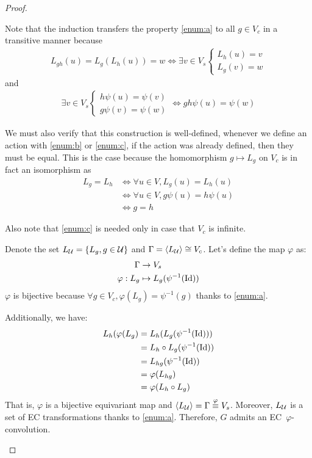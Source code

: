 \begin{proof}
\begin{enumerate}
Note that the induction transfers the property \ref{enum:a} to all $g \in V_c$ in a transitive manner because
\begin{gather*}
L_{gh}(u) = L_g(L_h(u)) = w \Leftrightarrow \exists v \in V_s
\begin{cases}
L_h(u) = v\\
L_g(v) = w
\end{cases}
\end{gather*}
and
\begin{gather*}
\exists v \in V_s
\begin{cases}
h\psi(u) = \psi(v)\\
g\psi(v) = \psi(w)
\end{cases}
\Leftrightarrow gh\psi(u) = \psi(w)
\end{gather*}

We must also verify that this construction is well-defined, \ie whenever we define an action with \ref{enum:b} or \ref{enum:c}, if the action was already defined, then they must be equal. This is the case because the homomorphism $g \mapsto L_g$ on $V_c$ is in fact an isomorphism as
\begin{align*}
L_g = L_h & \Leftrightarrow \forall u \in V, L_g(u) = L_h(u)\\
 & \Leftrightarrow \forall u \in V, g\psi(u) = h\psi(u)\\
 & \Leftrightarrow g = h
\end{align*}

Also note that \ref{enum:c} is needed only in case that $V_c$ is infinite.

Denote the set $L_{\mathcal{U}} = \{L_g, g \in \mathcal{U} \}$ and $\Gamma = \langle L_{\mathcal{U}} \rangle \cong V_c$. Let's define the map $\varphi$ as:
\begin{align*}
\Gamma & \rightarrow V_s\\
\varphi: L_g & \mapsto L_g(\psi^{-1}(\operatorname{Id}))
\end{align*}
$\varphi$ is bijective because $\forall g \in V_c, \varphi(L_g) = \psi^{-1}(g)$ thanks to \ref{enum:a}.

Additionally, we have:
\begin{align*}
L_h(\varphi(L_g) & = L_h(L_g(\psi^{-1}(\operatorname{Id})))\\
 & = L_h \circ L_g(\psi^{-1}(\operatorname{Id}))\\
 & = L_{hg}(\psi^{-1}(\operatorname{Id}))\\
 & = \varphi(L_{hg})\\
 & = \varphi(L_h \circ L_g)
\end{align*}
That is, $\varphi$ is a bijective equivariant map and $ \langle L_{\mathcal{U}} \rangle = \Gamma \overset{\varphi}{\equiv} V_s$. Moreover, $L_{\mathcal{U}}$ is a set of EC transformations thanks to \ref{enum:a}. Therefore, $G$ admits an EC~$\varphi$-convolution.
\end{enumerate}
\end{proof}

